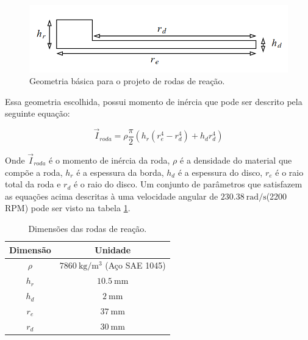 \begin{figure}[H]
  \caption{Geometria básica para o projeto de rodas de reação.}
  \begin{center}
      \includegraphics[scale=.45]{metodologia/img/roda_reacao_modelo}
  \end{center}
  \label{fig:motor_roda_desenho2}
\end{figure}

Essa geometria escolhida, possui momento de inércia que pode ser descrito pela seguinte equação:

\begin{equation}
\vec{I}_{roda} = \rho \frac{\pi}{2}(h_r(r_{e}^4-r_d^4)+h_dr_d^4) 
\end{equation}

Onde $\vec{I}_{roda}$ é o momento de inércia da roda, $\rho$ é a densidade do material que compõe a roda, $h_r$ é a espessura da borda, $h_d$ é a espessura do disco, $r_e$ é o raio total da roda e $r_d$ é o raio do disco. Um conjunto de parâmetros que satisfazem as equações acima descritas à uma velocidade angular de $\SI{230.38}{\radian\per\second}$(2200 RPM) pode ser visto na tabela \ref{tab:react}. 

\begin{table}[H]
  \caption{Dimensões das rodas de reação.}
  \label{tab:react}
  \centering%
  \begin{minipage}{.42\textwidth}
    \begin{tabular*}{\textwidth}{cc}
      \hline
      {Dimensão} & Unidade \\ \hline
      \hline
      $\rho$  &  $\SI{7860}{\kilogram\per\cubic\metre}$ (Aço SAE 1045)\\ 
      $h_r$   &  $\SI{10.5}{\milli\metre}$ \\
      $h_d$   &  $\SI{2}{\milli\metre}$  \\
      $r_e$   &  $\SI{37}{\milli\metre}$  \\
      $r_d$   &  $\SI{30}{\milli\metre}$  \\ \hline
    \end{tabular*}
  \end{minipage}
\end{table}

